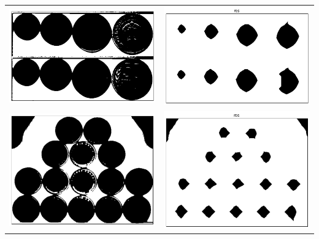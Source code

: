 \documentclass[12pt, a4paper]{article}
\begin{document}
\begin{center}
\begin{tabular}{c c}
			\includegraphics[width=8cm]{Money_11_bin.png} & \includegraphics[width=8cm]{Money_11_res.png} \\
			\includegraphics[width=8cm]{Money_12_bin.png} & \includegraphics[width=8cm]{Money_12_res.png} \\
		\end{tabular}


\end{center}
\end{document}
